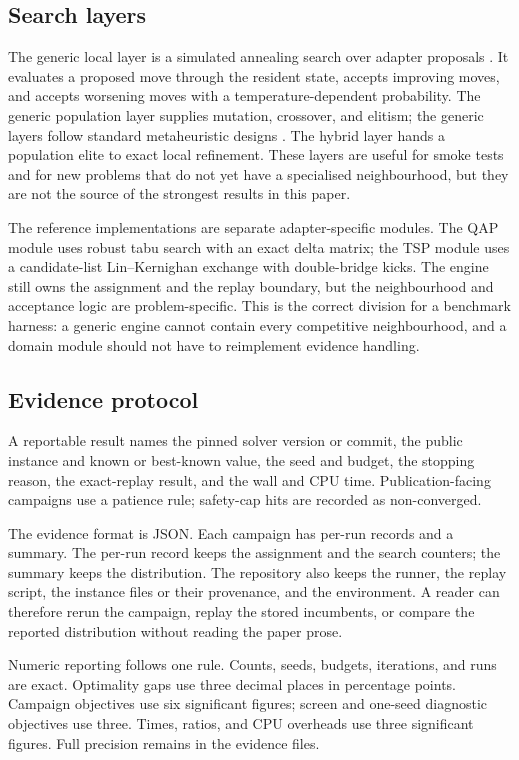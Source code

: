 \documentclass[11pt]{article}
\begin{document}
\subsection{Search layers}

The generic local layer is a simulated annealing search over adapter proposals \citep{kirkpatrick1983}. It evaluates a
proposed move through the resident state, accepts improving moves, and accepts worsening moves with a
temperature-dependent probability. The generic population layer supplies mutation, crossover, and
elitism; the generic layers follow standard metaheuristic designs \citep{talbi2009,pisinger2010}. The
hybrid layer hands a population elite to exact local refinement. These layers are useful
for smoke tests and for new problems that do not yet have a specialised neighbourhood, but they are
not the source of the strongest results in this paper.

The reference implementations are separate adapter-specific modules. The QAP module uses robust tabu
search with an exact delta matrix; the TSP module uses a candidate-list Lin--Kernighan exchange with
double-bridge kicks. The engine still owns the assignment and the replay boundary, but the
neighbourhood and acceptance logic are problem-specific. This is the correct division for a benchmark
harness: a generic engine cannot contain every competitive neighbourhood, and a domain module should
not have to reimplement evidence handling.

\subsection{Evidence protocol}

A reportable result names the pinned solver version or commit, the public instance and known or
best-known value, the seed and budget, the stopping reason, the exact-replay result, and the wall and
CPU time. Publication-facing campaigns use a patience rule; safety-cap hits are recorded as
non-converged.

The evidence format is JSON. Each campaign has per-run records and a summary. The per-run record keeps
the assignment and the search counters; the summary keeps the distribution. The repository also keeps
the runner, the replay script, the instance files or their provenance, and the environment. A reader
can therefore rerun the campaign, replay the stored incumbents, or compare the reported distribution
without reading the paper prose.

Numeric reporting follows one rule. Counts, seeds, budgets, iterations, and runs are exact.
Optimality gaps use three decimal places in percentage points. Campaign objectives use six
significant figures; screen and one-seed diagnostic objectives use three. Times, ratios, and CPU
overheads use three significant figures. Full precision remains in the evidence files.
\end{document}
